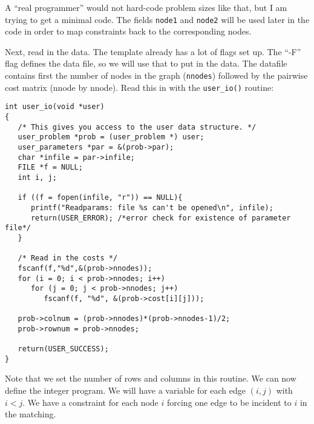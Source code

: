 \documentclass[11pt]{article}
\begin{document}
A ``real programmer'' would not hard-code problem sizes like that, but I am
trying to get a minimal code. The fields \texttt{node1} and \texttt{node2} will
be used later in the code in order to map constraints back to the
corresponding nodes.

Next, read in the data. The template already has a lot of flags set up. The
``-F'' flag defines the data file, so we will use that to put in the data. The
datafile contains first the number of nodes in the graph (\texttt{nnodes})
followed by the pairwise cost matrix (nnode by nnode). Read this in with the
\texttt{user\_io()} routine:

\begin{verbatim}
int user_io(void *user)
{
   /* This gives you access to the user data structure. */
   user_problem *prob = (user_problem *) user;
   user_parameters *par = &(prob->par);
   char *infile = par->infile;
   FILE *f = NULL;
   int i, j;

   if ((f = fopen(infile, "r")) == NULL){
      printf("Readparams: file %s can't be opened\n", infile);
      return(USER_ERROR); /*error check for existence of parameter file*/
   }

   /* Read in the costs */
   fscanf(f,"%d",&(prob->nnodes));
   for (i = 0; i < prob->nnodes; i++)
      for (j = 0; j < prob->nnodes; j++)
         fscanf(f, "%d", &(prob->cost[i][j]));
   
   prob->colnum = (prob->nnodes)*(prob->nnodes-1)/2;
   prob->rownum = prob->nnodes;

   return(USER_SUCCESS);
}
\end{verbatim}   

Note that we set the number of rows and columns in this routine. We can now
define the integer program. We will have a variable for each edge $(i,j)$ with
$i<j$. We have a constraint for each node $i$ forcing one edge to be incident
to $i$ in the matching.
\end{document}
